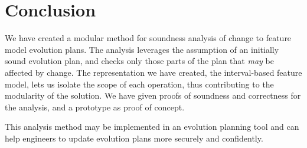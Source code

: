 \section{Conclusion}

We have created a modular method for soundness analysis of change to feature model evolution plans. The analysis leverages the assumption of an initially sound evolution plan, and checks only those parts of the plan that \emph{may} be affected by change. The representation we have created, the interval-based feature model, lets us isolate the scope of each operation, thus contributing to the modularity of the solution. We have given proofs of soundness and correctness for the analysis, and a prototype as proof of concept.

This analysis method may be implemented in an evolution planning tool and can help engineers to update evolution plans more securely and confidently.
